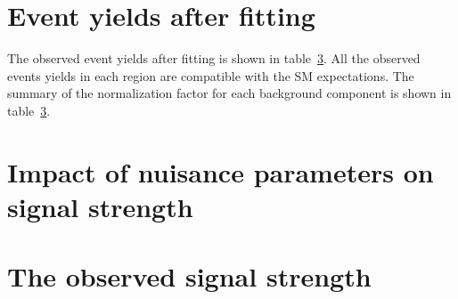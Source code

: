 \section{Event yields after fitting}
\label{sec:eventyields}

The observed event yields after fitting is shown in table~\ref{}.
All the observed events yields in each region are compatible with the SM expectations.
The summary of the normalization factor for each background component is shown in table~\ref{}. 

\section{Impact of nuisance parameters on signal strength}

\section{The observed signal strength}

